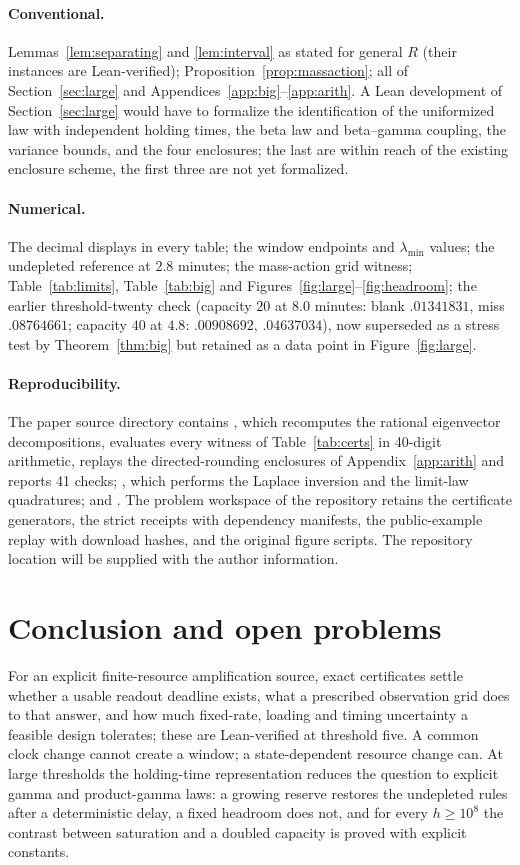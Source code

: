 \documentclass[11pt,a4paper]{article}
\newcommand{\RepositoryNote}{The repository location will be supplied with the author information.}
\theoremstyle{plain}
\theoremstyle{definition}
\theoremstyle{remark}
\begin{document}
\paragraph{Conventional.} Lemmas~\ref{lem:separating} and \ref{lem:interval} as stated for general $R$ (their instances are Lean-verified); Proposition~\ref{prop:massaction}; all of Section~\ref{sec:large} and Appendices~\ref{app:big}--\ref{app:arith}. A Lean development of Section~\ref{sec:large} would have to formalize the identification of the uniformized law with independent holding times, the beta law and beta--gamma coupling, the variance bounds, and the four enclosures; the last are within reach of the existing enclosure scheme, the first three are not yet formalized.

\paragraph{Numerical.} The decimal displays in every table; the window endpoints and $\lambda_{\min}$ values; the undepleted reference at $2.8$ minutes; the mass-action grid witness; Table~\ref{tab:limits}, Table~\ref{tab:big} and Figures~\ref{fig:large}--\ref{fig:headroom}; the earlier threshold-twenty check (capacity $20$ at $8.0$ minutes: blank $.01341831$, miss $.08764661$; capacity $40$ at $4.8$: $.00908692$, $.04637034$), now superseded as a stress test by Theorem~\ref{thm:big} but retained as a data point in Figure~\ref{fig:large}.

\paragraph{Reproducibility.} The paper source directory contains , which recomputes the rational eigenvector decompositions, evaluates every witness of Table~\ref{tab:certs} in 40-digit arithmetic, replays the directed-rounding enclosures of Appendix~\ref{app:arith} and reports 41 checks; , which performs the Laplace inversion and the limit-law quadratures; and . The problem workspace of the repository retains the certificate generators, the strict receipts with dependency manifests, the public-example replay with download hashes, and the original figure scripts. \RepositoryNote

\section{Conclusion and open problems}\label{sec:conclusion}
For an explicit finite-resource amplification source, exact certificates settle whether a usable readout deadline exists, what a prescribed observation grid does to that answer, and how much fixed-rate, loading and timing uncertainty a feasible design tolerates; these are Lean-verified at threshold five. A common clock change cannot create a window; a state-dependent resource change can. At large thresholds the holding-time representation reduces the question to explicit gamma and product-gamma laws: a growing reserve restores the undepleted rules after a deterministic delay, a fixed headroom does not, and for every $h\ge10^{8}$ the contrast between saturation and a doubled capacity is proved with explicit constants.
\end{document}
